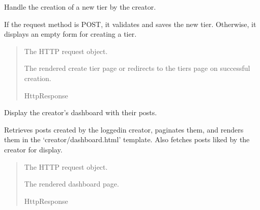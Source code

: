 \documentclass[letterpaper,10pt,english]{sphinxmanual}
\begin{document}

\begin{fulllineitems}
\label{\detokenize{modules/views:creator.views.create_tier}}
\pysigstartsignatures
{}
\pysigstopsignatures
\sphinxAtStartPar
Handle the creation of a new tier by the creator.

\sphinxAtStartPar
If the request method is POST, it validates and saves the new tier.
Otherwise, it displays an empty form for creating a tier.
\begin{quote}\begin{description}
\sphinxAtStartPar
{} \textendash{} The HTTP request object.

\sphinxAtStartPar
The rendered create tier page or redirects to the tiers page on successful creation.

\sphinxAtStartPar
HttpResponse

\end{description}\end{quote}

\end{fulllineitems}


\begin{fulllineitems}
\label{\detokenize{modules/views:creator.views.dashboard}}
\pysigstartsignatures
{}
\pysigstopsignatures
\sphinxAtStartPar
Display the creator’s dashboard with their posts.

\sphinxAtStartPar
Retrieves posts created by the logged\sphinxhyphen{}in creator, paginates them, and renders
them in the ‘creator/dashboard.html’ template. Also fetches posts liked by the
creator for display.
\begin{quote}\begin{description}
\sphinxAtStartPar
{} \textendash{} The HTTP request object.

\sphinxAtStartPar
The rendered dashboard page.

\sphinxAtStartPar
HttpResponse

\end{description}\end{quote}

\end{fulllineitems}
\end{document}
